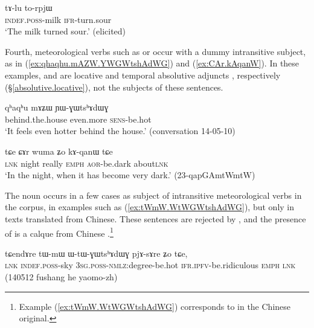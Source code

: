 \begin{exe}
\ex   \label{ex:tAlu.torpjW}
\gll    tɤ-lu to-rpjɯ \\
\textsc{indef}.\textsc{poss}-milk \textsc{ifr}-turn.sour \\
\glt `The milk turned sour.' (elicited)
\end{exe}

Fourth, meteorological verbs such as  or  occur with a dummy intransitive subject, as in (\ref{ex:qhaqhu.mAZW.YWGWtshAdWG}) and (\ref{ex:CAr.kAqanW}). In these examples,  and  are locative and temporal absolutive adjuncts , respectively (§\ref{absolutive.locative}), not the subjects of these sentences.

\begin{exe}
\ex   \label{ex:qhaqhu.mAZW.YWGWtshAdWG}
\gll qʰaqʰu mɤʑɯ ɲɯ-ɣɯtsʰɤdɯɣ \\
behind.the.house even.more \textsc{sens}-be.hot \\
\glt `It feels even hotter behind the house.' (conversation 14-05-10)
\end{exe}

\begin{exe}
\ex   \label{ex:CAr.kAqanW}
\gll  tɕe ɕɤr wuma ʑo kɤ-qanɯ tɕe \\
\textsc{lnk} night really \textsc{emph} \textsc{aor}-be.dark about\textsc{lnk} \\
\glt `In the night, when it has become very dark.' (23-qapGAmtWmtW)
\end{exe}

The noun  occurs in a few cases as subject of intransitive meteorological verbs in the corpus, in examples such as (\ref{ex:tWmW.WtWGWtshAdWG}), but only in texts translated from Chinese. These sentences are rejected by , and the presence of  is a calque from Chinese .\footnote{Example (\ref{ex:tWmW.WtWGWtshAdWG}) corresponds to  in the Chinese original.}

\begin{exe}
\ex   \label{ex:tWmW.WtWGWtshAdWG}
\gll tɕendɤre tɯ-mɯ ɯ-tɯ-ɣɯtsʰɤdɯɣ pjɤ-sɤre ʑo tɕe, \\
\textsc{lnk} \textsc{indef}.\textsc{poss}-sky \textsc{3sg}.\textsc{poss}-\textsc{nmlz}:degree-be.hot \textsc{ifr}.\textsc{ipfv}-be.ridiculous \textsc{emph} \textsc{lnk} \\
\glt (140512 fushang he yaomo-zh)	
\end{exe}

